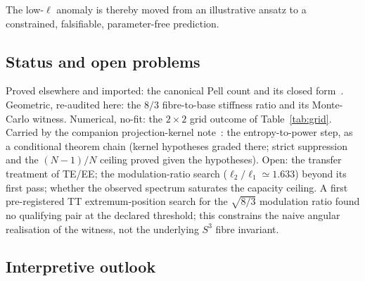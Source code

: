 \documentclass[11pt]{article}
\begin{document}
The low-$\ell$ anomaly is thereby moved from an illustrative ansatz to a constrained, falsifiable,
parameter-free prediction.

\subsection{Status and open problems}
\label{subsec:status}

Proved elsewhere and imported: the canonical Pell count and its closed form~\cite{Beau2026tb}.
Geometric, re-audited here: the $8/3$ fibre-to-base stiffness ratio and its Monte-Carlo witness.
Numerical, no-fit: the $2\times2$ grid outcome of Table~\ref{tab:grid}.
Carried by the companion projection-kernel note~\cite{Beau2026pce}: the entropy-to-power step, as a
conditional theorem chain (kernel hypotheses graded there; strict suppression and the $(N-1)/N$
ceiling proved given the hypotheses).
Open: the transfer treatment of TE/EE; the modulation-ratio search ($\ell_2/\ell_1\simeq1.633$)
beyond its first pass; whether the observed spectrum saturates the capacity ceiling.
A first pre-registered TT extremum-position search for the $\sqrt{8/3}$ modulation ratio found no
qualifying pair at the declared threshold; this constrains the naive angular realisation of the
witness, not the underlying $S^3$ fibre invariant.

\subsection{Interpretive outlook}
\label{subsec:outlook}
\end{document}
